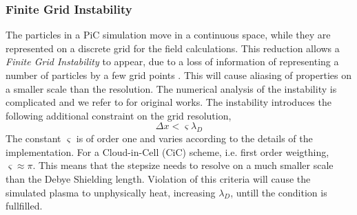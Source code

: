     \subsubsection{Finite Grid Instability}
        \label{sec:finite_grid_instability}
        The particles in a PiC simulation move in a continuous space, while they are
        represented on a discrete grid for the field calculations. This reduction allows
        a \textit{Finite Grid Instability} to appear, due to a loss of information of representing a number of particles by a few grid points \citep{lapenta_particle_????}.
		This will cause aliasing of properties on a smaller scale than the resolution.
        The numerical analysis of the instability is complicated and we refer to
        \citet{birdsall_plasma_2004,hockney_computer_1988} for original works.
        The instability introduces the following additional constraint on the grid resolution,
        \begin{equation}
            \Delta x < \varsigma \lambda_D
        \end{equation}
        The constant \(\varsigma\) is of order one and varies according to the details of the implementation.
		For a Cloud-in-Cell (CiC) scheme, i.e. first order weigthing, \(\varsigma \approx \pi\).
		This means that the stepsize needs to resolve on a much smaller scale than the
		Debye Shielding length. Violation of this criteria will cause the simulated plasma
		to unphysically heat, increasing \(\lambda_D\), untill the condition is fullfilled.
